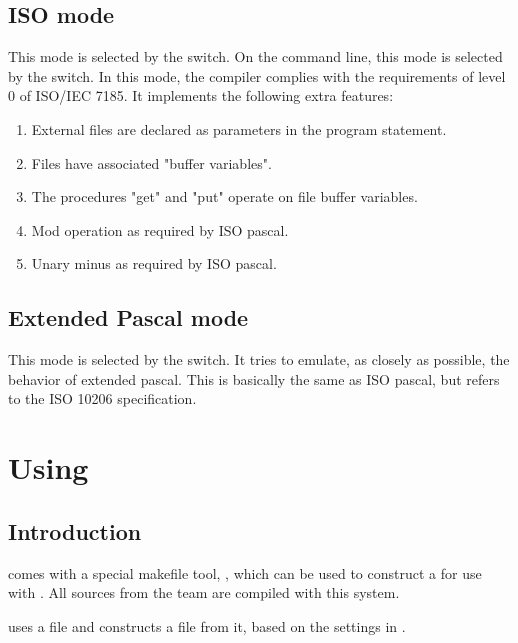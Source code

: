 \section{ISO mode}
This mode is selected by the  switch. On the
command line, this mode is selected by the  switch. In 
this mode, the compiler complies with the requirements of level 0  
 of ISO/IEC 7185. It implements the following extra features:
\begin{enumerate}
\item External files are declared as parameters in the program 
statement.
\item Files have associated "buffer variables".
\item The procedures "get" and "put" operate on file buffer variables.
\item Mod operation as required by ISO pascal.
\item Unary minus as required by ISO pascal.
\end{enumerate}

\section{Extended Pascal mode}
This mode is selected by the  switch. It tries to emulate,
as closely as possible, the behavior of extended pascal. This is basically
the same as ISO pascal, but refers to the ISO 10206 specification.




\chapter{Using }
\label{ch:makefile}
\newcommand{\mvar}[1]{\var{\$(#1)}}
\newcommand{\fpcmake}{\file{fpcmake}}
\section{Introduction}
\fpc comes with a special makefile tool, \fpcmake{}, which can be
used to construct a  for use with \gnu {}.
All sources from the \fpc team are compiled with this system.

\fpcmake{} uses a file  and constructs a file
 from it, based on the settings in .

